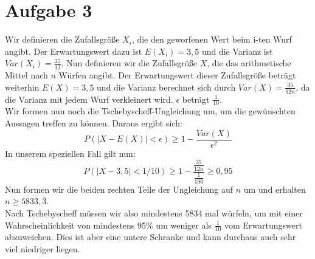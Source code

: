 \documentclass[10pt,a4paper]{article}
\begin{document}
\section*{Aufgabe 3}
Wir definieren die Zufallsgröße $X_i$, die den geworfenen Wert beim i-ten Wurf angibt. Der Erwartungswert dazu ist $E(X_i) = 3,5$ und die Varianz ist $Var(X_i)=\frac{35}{12}$. Nun definieren wir die Zufallsgröße $X$, die das arithmetische Mittel nach $n$ Würfen angibt. Der Erwartungswert dieser Zufallsgröße beträgt weiterhin $E(X) = 3,5$ und die Varianz berechnet sich durch $Var(X)=\frac{35}{12n}$, da die Varianz mit jedem Wurf verkleinert wird. $\epsilon$ beträgt $\frac{1}{10}$.\\
Wir formen nun noch die Tschebyscheff-Ungleichung um, um die gewünschten Aussagen treffen zu können. Daraus ergibt sich:
$$P(|X-E(X)| < \epsilon) \geq 1 - \frac{Var(X)}{\epsilon^2}$$
In unserem speziellen Fall gilt nun:
$$P(|X-3,5| < 1/10) \geq 1 - \frac{\frac{35}{12n}}{\frac{1}{100}} \geq 0,95$$
Nun formen wir die beiden rechten Teile der Ungleichung auf $n$ um und erhalten $n \geq 5833,\overline{3}$.\\
Nach Tschebyscheff müssen wir also mindestens 5834 mal würfeln, um mit einer Wahrscheinlichkeit von mindestens 95\% um weniger als $\frac{1}{10}$ vom Erwartungswert abzuweichen. Dies ist aber eine untere Schranke und kann durchaus auch sehr viel niedriger liegen.
\end{document}
